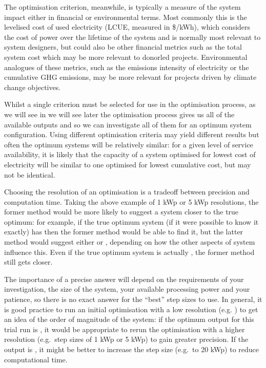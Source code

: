 \documentclass[letterpaper,10pt,english]{sphinxmanual}
\begin{document}
\sphinxAtStartPar
The optimisation criterion, meanwhile, is typically a measure of the
system impact either in financial or environmental terms. Most commonly
this is the levelised cost of used electricity (LCUE, measured in
\$/kWh), which considers the cost of power over the lifetime of the
system and is normally most relevant to system designers, but could also
be other financial metrics such as the total system cost which may be
more relevant to donor\sphinxhyphen{}led projects. Environmental analogues of these
metrics, such as the emissions intensity of electricity or the
cumulative GHG emissions, may be more relevant for projects driven by
climate change objectives.

\sphinxAtStartPar
Whilst a single criterion must be selected for use in the optimisation
process, as we will see in we will see later
the optimisation process gives us all of the available outputs and so we
can investigate all of them for an optimum system configuration. Using
different optimisation criteria may yield different results but often
the optimum systems will be relatively similar: for a given level of
service availability, it is likely that the capacity of a system
optimised for lowest cost of electricity will be similar to one
optimised for lowest cumulative cost, but may not be identical.

\sphinxAtStartPar
Choosing the resolution of an optimisation is a trade\sphinxhyphen{}off between
precision and computation time. Taking the above example of 1 kWp or 5
kWp resolutions, the former method would be more likely to suggest a
system closer to the true optimum: for example, if the true optimum
system (if it were possible to know it exactly) has  then
the former method would be able to find it, but the latter method would
suggest either  or , depending on how the
other aspects of system influence this. Even if the true optimum system
is actually , the former method still gets closer.

\sphinxAtStartPar
The importance of a precise answer will depend on the requirements of
your investigation, the size of the system, your available processing
power and your patience, so there is no exact answer for the “best” step
sizes to use. In general, it is good practice to run an initial
optimisation with a low resolution (e.g. ) to get an
idea of the order of magnitude of the system: if the optimum output for
this trial run is , it would be appropriate to re\sphinxhyphen{}run
the optimisation with a higher resolution (e.g. step sizes of 1 kWp or 5
kWp) to gain greater precision. If the output is , it
might be better to increase the step size (e.g. to 20 kWp) to reduce
computational time.
\end{document}
